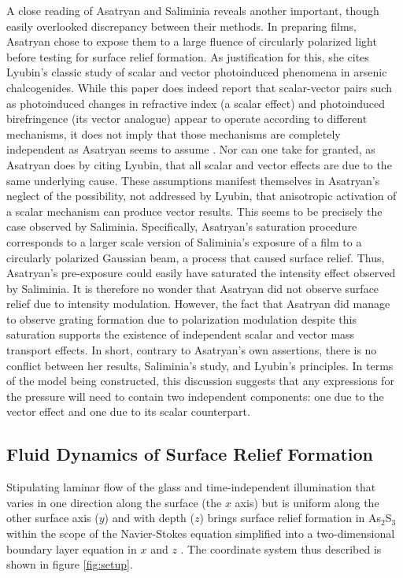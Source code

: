 \documentclass[twocolumn,showpacs,preprintnumbers,amsmath,amssymb]{revtex4}
\begin{document}
A close reading of Asatryan and Saliminia reveals another important,
though easily overlooked discrepancy between their methods. In
preparing films, Asatryan chose to expose them to a large fluence of
circularly polarized light before testing for surface relief
formation. As justification for this, she cites Lyubin's classic study
of scalar and vector photoinduced phenomena in arsenic
chalcogenides. While this paper does indeed report that scalar-vector
pairs such as photoinduced changes in refractive index (a scalar
effect) and photoinduced birefringence (its vector analogue) appear to
operate according to different mechanisms, it does not imply that
those mechanisms are completely independent as Asatryan seems to
assume \cite{lyubin89}. Nor can one take for granted, as Asatryan does
by citing Lyubin, that all scalar and vector effects are due to the
same underlying cause. These assumptions manifest themselves in
Asatryan's neglect of the possibility, not addressed by Lyubin, that
anisotropic activation of a scalar mechanism can produce vector
results. This seems to be precisely the case observed by Saliminia.
Specifically, Asatryan's saturation procedure corresponds to a larger
scale version of Saliminia's exposure of a film to a circularly
polarized Gaussian beam, a process that caused surface relief. Thus,
Asatryan's pre-exposure could easily have saturated the intensity
effect observed by Saliminia. It is therefore no wonder that Asatryan
did not observe surface relief due to intensity modulation. However,
the fact that Asatryan did manage to observe grating formation due to
polarization modulation despite this saturation supports the existence
of independent scalar and vector mass transport effects. In short,
contrary to Asatryan's own assertions, there is no conflict between
her results, Saliminia's study, and Lyubin's principles. In terms of
the model being constructed, this discussion suggests that any
expressions for the pressure will need to contain two independent
components: one due to the vector effect and one due to its scalar
counterpart.

\subsection{Fluid Dynamics of Surface Relief Formation}

\label{sec:fluids} Stipulating laminar flow of the glass and
time-independent illumination that varies in one direction along the
surface (the $x$ axis) but is uniform along the other surface axis
($y$) and with depth ($z$) brings surface relief formation in
As$_2$S$_3$ within the scope of the Navier-Stokes equation simplified
into a two-dimensional boundary layer equation in $x$ and $z$
\cite{levich}. The coordinate system thus described is shown in figure
\ref{fig:setup}.
\end{document}
